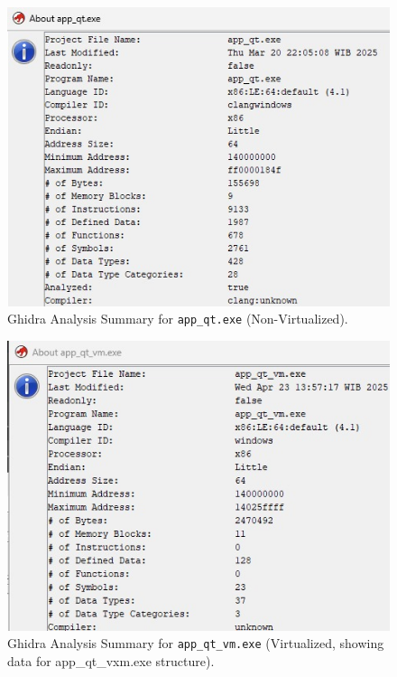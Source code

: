 \begin{figure}[!t]
	\centering
	\includegraphics[width=0.9\linewidth]{../assets/pics/app_qt_summary_result.jpeg}
	\caption{Ghidra Analysis Summary for \texttt{app\_qt.exe} (Non-Virtualized).}
	\label{fig:ghidra_summary_qt_journal}
\end{figure}

\begin{figure}[!t]
	\centering
	\includegraphics[width=0.9\linewidth]{../assets/pics/app_qt_vm_summary_result.jpeg}
	\caption{Ghidra Analysis Summary for \texttt{app\_qt\_vm.exe} (Virtualized, showing data for app\_qt\_vxm.exe structure).}
	\label{fig:ghidra_summary_qt_vm_journal}
\end{figure}


